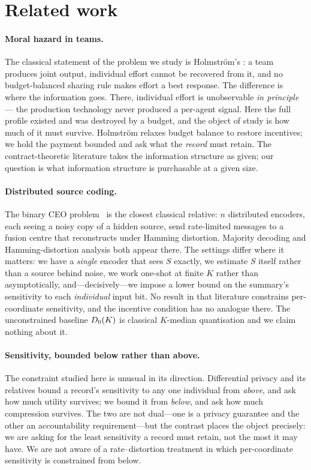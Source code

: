 \section{Related work}
\label{sec:related}

\paragraph{Moral hazard in teams.}
The classical statement of the problem we study is Holmstr\"{o}m's
\cite{holmstrom1982}: a team produces joint output, individual effort cannot be
recovered from it, and no budget-balanced sharing rule makes effort a best
response. The difference is where the information goes. There, individual effort
is unobservable \emph{in principle} --- the production technology never produced a
per-agent signal. Here the full profile existed and was destroyed by a budget,
and the object of study is how much of it must survive. Holmstr\"{o}m relaxes
budget balance to restore incentives; we hold the payment bounded and ask what
the \emph{record} must retain. The contract-theoretic literature takes the
information structure as given; our question is what information structure is
purchasable at a given size.

\paragraph{Distributed source coding.}
The binary CEO problem~\cite{berger1996ceo,binaryceologloss} is the closest
classical relative: $n$ distributed
encoders, each seeing a noisy copy of a hidden source, send rate-limited messages
to a fusion centre that reconstructs under Hamming distortion. Majority decoding
and Hamming-distortion analysis both appear there. The settings differ where it
matters: we have a \emph{single} encoder that sees $S$ exactly, we estimate $S$
itself rather than a source behind noise, we work one-shot at finite $K$ rather
than asymptotically, and---decisively---we impose a lower bound on the summary's
sensitivity to each \emph{individual} input bit. No result in that literature
constrains per-coordinate sensitivity, and the incentive condition has no
analogue there. The unconstrained baseline $D_0(K)$ is classical
$K$-median quantisation and we claim nothing about it.

\paragraph{Sensitivity, bounded below rather than above.}
The constraint studied here is unusual in its direction. Differential privacy and
its relatives bound a record's sensitivity to any one individual from
\emph{above}, and ask how much utility survives; we bound it from \emph{below},
and ask how much compression survives. The two are not dual---one is a privacy
guarantee and the other an accountability requirement---but the contrast places
the object precisely: we are asking for the least sensitivity a record must
retain, not the most it may have. We are not aware of a rate--distortion
treatment in which per-coordinate sensitivity is constrained from below.

